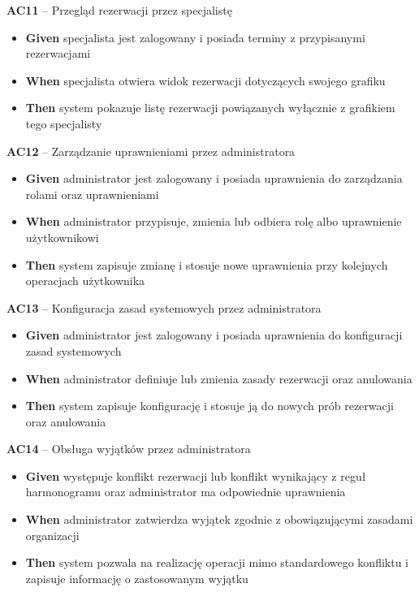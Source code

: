 \documentclass[12pt,a4paper]{article}
\begin{document}
\textbf{AC11} -- Przegląd rezerwacji przez specjalistę
\begin{itemize}[itemsep=2pt]
\item \textbf{Given} specjalista jest zalogowany i posiada terminy z przypisanymi rezerwacjami
\item \textbf{When} specjalista otwiera widok rezerwacji dotyczących swojego grafiku
\item \textbf{Then} system pokazuje listę rezerwacji powiązanych wyłącznie z grafikiem tego specjalisty
\end{itemize}

\textbf{AC12} -- Zarządzanie uprawnieniami przez administratora
\begin{itemize}[itemsep=2pt]
\item \textbf{Given} administrator jest zalogowany i posiada uprawnienia do zarządzania rolami oraz uprawnieniami
\item \textbf{When} administrator przypisuje, zmienia lub odbiera rolę albo uprawnienie użytkownikowi
\item \textbf{Then} system zapisuje zmianę i stosuje nowe uprawnienia przy kolejnych operacjach użytkownika
\end{itemize}

\textbf{AC13} -- Konfiguracja zasad systemowych przez administratora
\begin{itemize}[itemsep=2pt]
\item \textbf{Given} administrator jest zalogowany i posiada uprawnienia do konfiguracji zasad systemowych
\item \textbf{When} administrator definiuje lub zmienia zasady rezerwacji oraz anulowania
\item \textbf{Then} system zapisuje konfigurację i stosuje ją do nowych prób rezerwacji oraz anulowania
\end{itemize}

\textbf{AC14} -- Obsługa wyjątków przez administratora
\begin{itemize}[itemsep=2pt]
\item \textbf{Given} występuje konflikt rezerwacji lub konflikt wynikający z reguł harmonogramu oraz administrator ma odpowiednie uprawnienia
\item \textbf{When} administrator zatwierdza wyjątek zgodnie z obowiązującymi zasadami organizacji
\item \textbf{Then} system pozwala na realizację operacji mimo standardowego konfliktu i zapisuje informację o zastosowanym wyjątku
\end{itemize}
\end{document}
